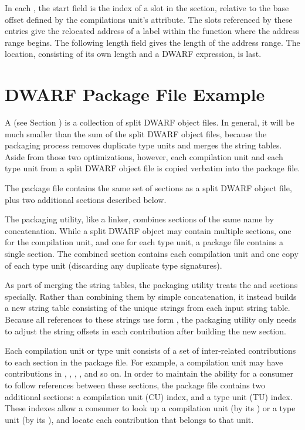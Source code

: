 In each \DWLLEstartlengthentry{}, the start field is the index
of a slot in the \dotdebugaddr{} section, relative to the base
offset defined by the compilations unit's \DWATaddrbase{}
attribute. The \dotdebugaddr{} slots referenced by these entries give
the relocated address of a label within the function where the
address range begins. 
The following length field gives the length of the
address range. The location, consisting of its own length and
a DWARF expression, is last.

\clearpage
\section{DWARF Package File Example}
\label{app:dwarfpackagefileexample}

A  
(see Section ) 
is a collection of split DWARF object files.
In general, it will be much smaller than the sum of the split
DWARF object files, because the packaging process removes duplicate
type units and merges the string tables. Aside from those two
optimizations, however, each compilation unit and each type unit
from a split DWARF object file is copied verbatim into the package
file.

The package file contains the same set of sections as a split
DWARF object file, plus two additional sections described below.

The packaging utility, like a linker, combines sections of the
same name by concatenation. While a split DWARF object may
contain multiple \dotdebuginfodwo{} sections, one for the
compilation unit, and one for each type unit, a package file
contains a single \dotdebuginfodwo{} section. The combined
\dotdebuginfodwo{} section contains each compilation unit and one
copy of each type unit (discarding any duplicate type
signatures).

As part of merging the string tables, the packaging utility
treats the \dotdebugstrdwo{} and \dotdebugstroffsetsdwo{}
sections specially. Rather than
combining them by simple concatenation, it instead builds a new
string table consisting of the unique strings from each input
string table. Because all references to these strings use
form \DWFORMstrx{},
the packaging utility only needs to adjust the
string offsets in each \dotdebugstroffsetsdwo{} contribution after
building the new \dotdebugstrdwo{} section.

Each compilation unit or type unit consists of a set of
inter-related contributions to each section in the package file.
For example, a compilation unit may have contributions in
\dotdebuginfodwo{}, \dotdebugabbrevdwo{}, \dotdebuglinedwo{},
\dotdebugstroffsetsdwo{}, and so on. In order to maintain the ability 
for a consumer to follow references between these sections, the
package file contains two additional sections: a compilation unit
(CU) index, and a type unit (TU) index. These indexes allow a
consumer to look up a compilation unit (by its \CUsignature) or 
a type unit (by its \TUsignature), and locate each contribution 
that belongs to that unit.

